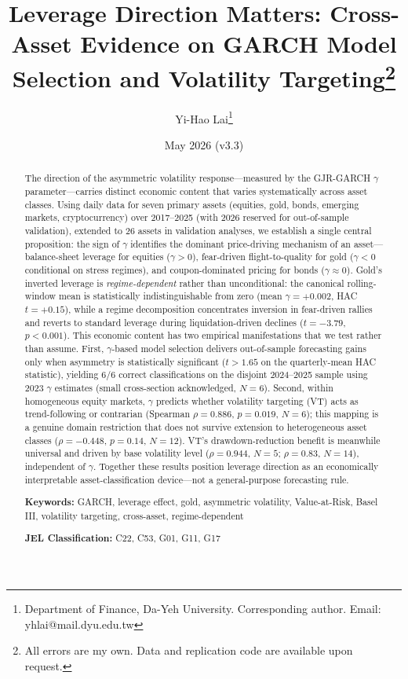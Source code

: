 \documentclass[12pt,a4paper]{article}
\title{Leverage Direction Matters: Cross-Asset Evidence on GARCH Model Selection and Volatility Targeting\thanks{All errors are my own. Data and replication code are available upon request.}}
\author{Yi-Hao Lai\thanks{Department of Finance, Da-Yeh University. Corresponding author. Email: yhlai@mail.dyu.edu.tw}}
\date{May 2026 (v3.3)}
\begin{document}
\maketitle

\begin{abstract}
\noindent
The direction of the asymmetric volatility response---measured by the GJR-GARCH $\gamma$ parameter---carries distinct economic content that varies systematically across asset classes. Using daily data for seven primary assets (equities, gold, bonds, emerging markets, cryptocurrency) over 2017--2025 (with 2026 reserved for out-of-sample validation), extended to 26 assets in validation analyses, we establish a single central proposition: the sign of $\gamma$ identifies the dominant price-driving mechanism of an asset---balance-sheet leverage for equities ($\gamma > 0$), fear-driven flight-to-quality for gold ($\gamma < 0$ conditional on stress regimes), and coupon-dominated pricing for bonds ($\gamma \approx 0$). Gold's inverted leverage is \emph{regime-dependent} rather than unconditional: the canonical rolling-window mean is statistically indistinguishable from zero (mean $\gamma = +0.002$, HAC $t = +0.15$), while a regime decomposition concentrates inversion in fear-driven rallies and reverts to standard leverage during liquidation-driven declines ($t = -3.79$, $p < 0.001$). This economic content has two empirical manifestations that we test rather than assume. First, $\gamma$-based model selection delivers out-of-sample forecasting gains only when asymmetry is statistically significant ($t > 1.65$ on the quarterly-mean HAC statistic), yielding 6/6 correct classifications on the disjoint 2024--2025 sample using 2023 $\gamma$ estimates (small cross-section acknowledged, $N = 6$). Second, within homogeneous equity markets, $\gamma$ predicts whether volatility targeting (VT) acts as trend-following or contrarian (Spearman $\rho = 0.886$, $p = 0.019$, $N = 6$); this mapping is a genuine domain restriction that does not survive extension to heterogeneous asset classes ($\rho = -0.448$, $p = 0.14$, $N = 12$). VT's drawdown-reduction benefit is meanwhile universal and driven by base volatility level ($\rho = 0.944$, $N = 5$; $\rho = 0.83$, $N = 14$), independent of $\gamma$. Together these results position leverage direction as an economically interpretable asset-classification device---not a general-purpose forecasting rule.

\medskip
\noindent
\textbf{Keywords:} GARCH, leverage effect, gold, asymmetric volatility, Value-at-Risk, Basel III, volatility targeting, cross-asset, regime-dependent

\medskip
\noindent
\textbf{JEL Classification:} C22, C53, G01, G11, G17
\end{abstract}
\end{document}
